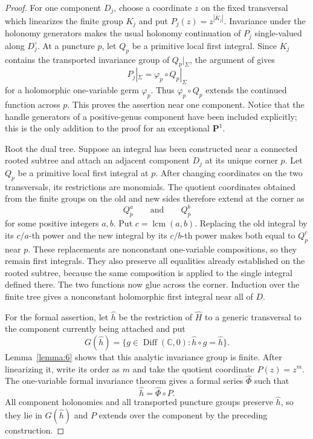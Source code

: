 \documentclass[11pt,twoside]{amsart}
\newcommand{\C}{\mathbb C}
\DeclareMathOperator{\Diff}{Diff}
\theoremstyle{definition}
\begin{document}
\begin{proof}
For one component $D_j$, choose a coordinate $z$ on the fixed transversal
which linearizes the finite group $K_j$ and put $P_j(z)=z^{|K_j|}$.
Invariance under the holonomy generators makes the usual holonomy
continuation of $P_j$ single-valued along $D_j^\circ$. At a puncture $p$,
let $Q_p$ be a primitive local first integral. Since $K_j$ contains the
transported invariance group of $Q_p|_\Sigma$, the argument of
\cite[Chapter~V, \S1, Lemmas~2 and~3]{MatteiMoussu1980} gives
\[
 P_j|_\Sigma=\varphi_p\circ Q_p|_\Sigma
\]
for a holomorphic one-variable germ $\varphi_p$. Thus
$\varphi_p\circ Q_p$ extends the continued function across $p$. This proves
the assertion near one component. Notice that the handle generators of a
positive-genus component have been included explicitly; this is the only
addition to the proof for an exceptional $\mathbf P^1$.

Root the dual tree. Suppose an integral has been constructed near a
connected rooted subtree and attach an adjacent component $D_j$ at its
unique corner $p$. Let $Q_p$ be a primitive local first integral at $p$.
After changing coordinates on the two transversals, its restrictions are
monomials. The quotient coordinates obtained from the finite groups on the
old and new sides therefore extend at the corner as
\[
 Q_p^{a}\qquad\text{and}\qquad Q_p^{b}
\]
for some positive integers $a,b$. Put $c=\operatorname{lcm}(a,b)$.
Replacing the old integral by its $c/a$-th power and the new integral by
its $c/b$-th power makes both equal to $Q_p^c$ near $p$. These replacements
are nonconstant one-variable compositions, so they remain first integrals.
They also preserve all equalities already established on the rooted
subtree, because the same composition is applied to the single integral
defined there. The two functions now glue across the corner. Induction over
the finite tree gives a nonconstant holomorphic first integral near all of
$D$.

For the formal assertion, let $\widehat h$ be the restriction of
$\widehat H$ to a generic transversal to the component currently being
attached and put
\[
 G(\widehat h)=
 \{g\in\Diff(\C,0):\widehat h\circ g=\widehat h\}.
\]
Lemma~\ref{lemma:6} shows that this analytic invariance group is finite.
After linearizing it, write its order as $m$ and take the quotient
coordinate $P(z)=z^m$. The one-variable formal invariance theorem
\cite[Chapter~I, Proposition~1.2]{MatteiMoussu1980} gives a formal series
$\widehat\Phi$ such that
\[
 \widehat h=\widehat\Phi\circ P.
\]
All component holonomies and all transported puncture groups preserve
$\widehat h$, so they lie in $G(\widehat h)$ and $P$ extends over the
component by the preceding construction.


\end{proof}
\end{document}
